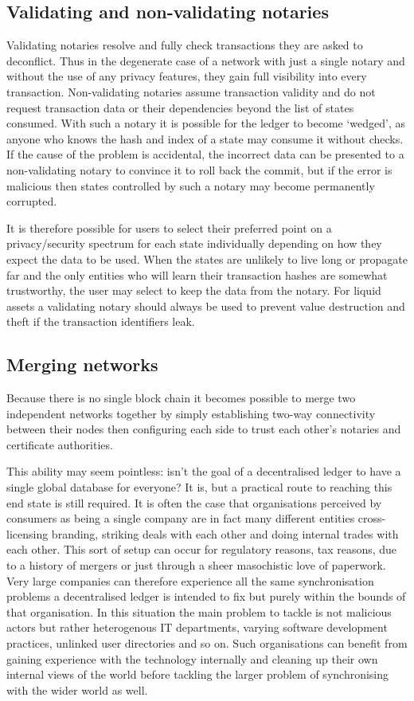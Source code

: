 \documentclass{article}
\begin{document}
\subsection{Validating and non-validating notaries}

Validating notaries resolve and fully check transactions they are asked to deconflict. Thus in the degenerate case of a
network with just a single notary and without the use of any privacy features, they gain full visibility into every
transaction. Non-validating notaries assume transaction validity and do not request transaction data or their
dependencies beyond the list of states consumed. With such a notary it is possible for the ledger to become `wedged', as
anyone who knows the hash and index of a state may consume it without checks. If the cause of the problem is accidental,
the incorrect data can be presented to a non-validating notary to convince it to roll back the commit, but if the error
is malicious then states controlled by such a notary may become permanently corrupted.

It is therefore possible for users to select their preferred point on a privacy/security spectrum for each state individually
depending on how they expect the data to be used. When the states are unlikely to live long or propagate far and the only
entities who will learn their transaction hashes are somewhat trustworthy, the user may select to keep the data from the
notary. For liquid assets a validating notary should always be used to prevent value destruction and theft if the transaction
identifiers leak.

\subsection{Merging networks}

Because there is no single block chain it becomes possible to merge two independent networks together by simply establishing
two-way connectivity between their nodes then configuring each side to trust each other's notaries and certificate authorities.

This ability may seem pointless: isn't the goal of a decentralised ledger to have a single global database for everyone?
It is, but a practical route to reaching this end state is still required. It is often the case that organisations
perceived by consumers as being a single company are in fact many different entities cross-licensing branding, striking
deals with each other and doing internal trades with each other. This sort of setup can occur for regulatory reasons,
tax reasons, due to a history of mergers or just through a sheer masochistic love of paperwork. Very large companies can
therefore experience all the same synchronisation problems a decentralised ledger is intended to fix but purely within
the bounds of that organisation. In this situation the main problem to tackle is not malicious actors but rather
heterogenous IT departments, varying software development practices, unlinked user directories and so on.
Such organisations can benefit from gaining experience with the technology internally and cleaning up their own
internal views of the world before tackling the larger problem of synchronising with the wider world as well.
\end{document}
